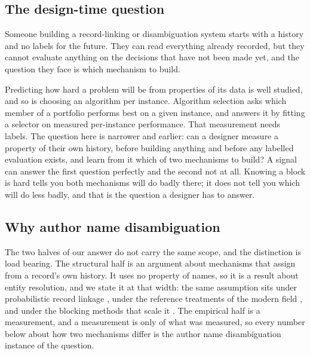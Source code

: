 \documentclass[11pt]{article}
\begin{document}
\subsection{The design-time question}
\label{sec:the-question}

Someone building a record-linking or disambiguation system starts with a
history and no labels for the future. They can read everything already
recorded, but they cannot evaluate anything on the decisions that have not
been made yet, and the question they face is which mechanism to build.

Predicting how hard a problem will be from properties of its data is well
studied, and so is choosing an algorithm per instance. Algorithm selection
\citep{rice1976, smithmiles2009, barbudo2023} asks which member of a portfolio
performs best on a given instance, and answers it by fitting a selector on
measured per-instance performance. That measurement needs labels. The question
here is narrower and earlier: can a designer measure a property of their own
history, before building anything and before any labelled evaluation exists,
and learn from it which of two mechanisms to build? A signal can answer the
first question perfectly and the second not at all. Knowing a block is hard
tells you both mechanisms will do badly there; it does not tell you which will
do less badly, and that is the question a designer has to answer.

\subsection{Why author name disambiguation}
\label{sec:why-and}

The two halves of our answer do not carry the same scope, and the distinction
is load bearing. The structural half is an argument about mechanisms that
assign from a record's own history. It uses no property of names, so it is a
result about entity resolution, and we state it at that width: the same
assumption sits under probabilistic record linkage \citep{fellegisunter1969},
under the reference treatments of the modern field \citep{christen2012}, and
under the blocking methods that scale it \citep{papadakis2020}. The empirical half is a
measurement, and a measurement is only of what was measured, so every number
below about how two mechanisms differ is the author name disambiguation
instance of the question.
\end{document}
